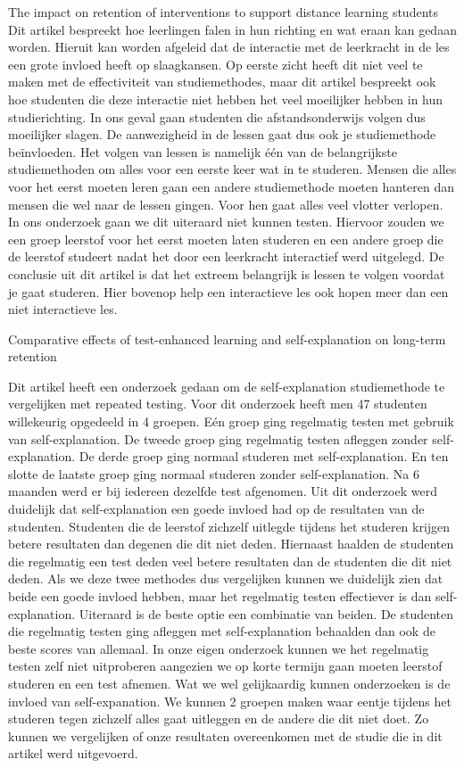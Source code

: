 \documentclass{hogent-article}
\begin{document}
	The impact on retention of interventions to support distance learning students \autocite{Simpson2004}
	Dit artikel bespreekt hoe leerlingen falen in hun richting en wat eraan kan gedaan worden. Hieruit kan worden afgeleid dat de interactie met de leerkracht in de les een grote invloed heeft op slaagkansen. Op eerste zicht heeft dit niet veel te maken met de effectiviteit van studiemethodes, maar dit artikel bespreekt ook hoe studenten die deze interactie niet hebben het veel moeilijker hebben in hun studierichting. In ons geval gaan studenten die afstandsonderwijs volgen dus moeilijker slagen. De aanwezigheid in de lessen gaat dus ook je studiemethode beïnvloeden. Het volgen van lessen is namelijk één van de belangrijkste studiemethoden om alles voor een eerste keer wat in te studeren. Mensen die alles voor het eerst moeten leren gaan een andere studiemethode moeten hanteren dan mensen die wel naar de lessen gingen. Voor hen gaat alles veel vlotter verlopen. In ons onderzoek gaan we dit uiteraard niet kunnen testen. Hiervoor zouden we een groep leerstof voor het eerst moeten laten studeren en een andere groep die de leerstof studeert nadat het door een leerkracht interactief werd uitgelegd. De conclusie uit dit artikel is dat het extreem belangrijk is lessen te volgen voordat je gaat studeren. Hier bovenop help een interactieve les ook hopen meer dan een niet interactieve les.
	
	Comparative effects of test-enhanced learning and self-explanation on long-term retention \autocite{LarsenButlerRoediger2013}
	
	Dit artikel heeft een onderzoek gedaan om de self-explanation studiemethode te vergelijken met repeated testing. Voor dit onderzoek heeft men 47 studenten willekeurig opgedeeld in 4 groepen. Eén groep ging regelmatig testen met gebruik van self-explanation. De tweede groep ging regelmatig testen afleggen zonder self-explanation. De derde groep ging normaal studeren met self-explanation. En ten slotte de laatste groep ging normaal studeren zonder self-explanation. Na 6 maanden werd er bij iedereen dezelfde test afgenomen. Uit dit onderzoek werd duidelijk dat self-explanation een goede invloed had op de resultaten van de studenten. Studenten die de leerstof zichzelf uitlegde tijdens het studeren krijgen betere resultaten dan degenen die dit niet deden. Hiernaast haalden de studenten die regelmatig een test deden veel betere resultaten dan de studenten die dit niet deden. Als we deze twee methodes dus vergelijken kunnen we duidelijk zien dat beide een goede invloed hebben, maar het regelmatig testen effectiever is dan self-explanation. Uiteraard is de beste optie een combinatie van beiden. De studenten die regelmatig testen ging afleggen met self-explanation behaalden dan ook de beste scores van allemaal. In onze eigen onderzoek kunnen we het regelmatig testen zelf niet uitproberen aangezien we op korte termijn gaan moeten leerstof studeren en een test afnemen. Wat we wel gelijkaardig kunnen onderzoeken is de invloed van self-expanation. We kunnen 2 groepen maken waar eentje tijdens het studeren tegen zichzelf alles gaat uitleggen en de andere die dit niet doet. Zo kunnen we vergelijken of onze resultaten overeenkomen met de studie die in dit artikel werd uitgevoerd.
	
\end{document}
